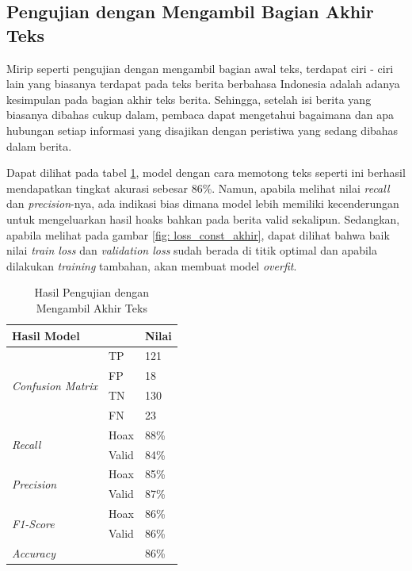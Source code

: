 \subsection{Pengujian dengan Mengambil Bagian Akhir Teks}

Mirip seperti pengujian dengan mengambil bagian awal teks, terdapat ciri - ciri lain yang biasanya terdapat pada teks berita berbahasa Indonesia adalah adanya kesimpulan pada bagian akhir teks berita. Sehingga, setelah isi berita yang biasanya dibahas cukup dalam, pembaca dapat mengetahui bagaimana dan apa hubungan setiap informasi yang disajikan dengan peristiwa yang sedang dibahas dalam berita.

Dapat dilihat pada tabel \ref{tab: const_akhir}, model dengan cara memotong teks seperti ini berhasil mendapatkan tingkat akurasi sebesar 86\%. Namun, apabila melihat nilai \textit{recall} dan \textit{precision}-nya, ada indikasi bias dimana model lebih memiliki kecenderungan untuk mengeluarkan hasil hoaks bahkan pada berita valid sekalipun. Sedangkan, apabila melihat pada gambar \ref{fig: loss_const_akhir}, dapat dilihat bahwa baik nilai \textit{train loss} dan \textit{validation loss} sudah berada di titik optimal dan apabila dilakukan \textit{training} tambahan, akan membuat model \textit{overfit}.

\begin{table}
    \caption{Hasil Pengujian dengan Mengambil Akhir Teks}
    \label{tab: const_akhir}
    \centering
    \begin{tabular}{|l|l|l|}
        \hline
        \multicolumn{2}{|l|}{\textbf{Hasil Model}} & \textbf{Nilai}        \\ \hline
        \multirow{4}{*}{\textit{Confusion Matrix}} & TP             & 121  \\ \cline{2-3}
                                                   & FP             & 18   \\ \cline{2-3}
                                                   & TN             & 130  \\ \cline{2-3}
                                                   & FN             & 23   \\ \hline
        \multirow{2}{*}{\textit{Recall}}           & Hoax           & 88\% \\ \cline{2-3}
                                                   & Valid          & 84\% \\ \hline
        \multirow{2}{*}{\textit{Precision}}        & Hoax           & 85\% \\ \cline{2-3}
                                                   & Valid          & 87\% \\ \hline
        \multirow{2}{*}{\textit{F1-Score}}         & Hoax           & 86\% \\ \cline{2-3}
                                                   & Valid          & 86\% \\ \hline
        \multicolumn{2}{|l|}{\textit{Accuracy}}    & 86\%                  \\ \hline
    \end{tabular}
\end{table}


